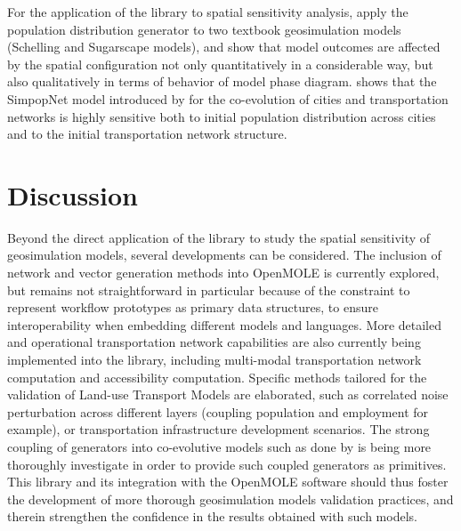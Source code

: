 \documentclass[11pt]{article}
\begin{document}
For the application of the library to spatial sensitivity analysis, \cite{raimbault2019space} apply the population distribution generator to two textbook geosimulation models (Schelling and Sugarscape models), and show that model outcomes are affected by the spatial configuration not only quantitatively in a considerable way, but also qualitatively in terms of behavior of model phase diagram. \cite{raimbault2020unveiling} shows that the SimpopNet model introduced by \cite{schmitt2014modelisation} for the co-evolution of cities and transportation networks is highly sensitive both to initial population distribution across cities and to the initial transportation network structure.


\section{Discussion}


Beyond the direct application of the library to study the spatial sensitivity of geosimulation models, several developments can be considered. The inclusion of network and vector generation methods into OpenMOLE is currently explored, but remains not straightforward in particular because of the constraint to represent workflow prototypes as primary data structures, to ensure interoperability when embedding different models and languages. More detailed and operational transportation network capabilities are also currently being implemented into the library, including multi-modal transportation network computation and accessibility computation. Specific methods tailored for the validation of Land-use Transport Models are elaborated, such as correlated noise perturbation across different layers (coupling population and employment for example), or transportation infrastructure development scenarios. The strong coupling of generators into co-evolutive models such as done by \cite{raimbault2019urban} is being more thoroughly investigate in order to provide such coupled generators as primitives. This library and its integration with the OpenMOLE software should thus foster the development of more thorough geosimulation models validation practices, and therein strengthen the confidence in the results obtained with such models.






\end{document}
